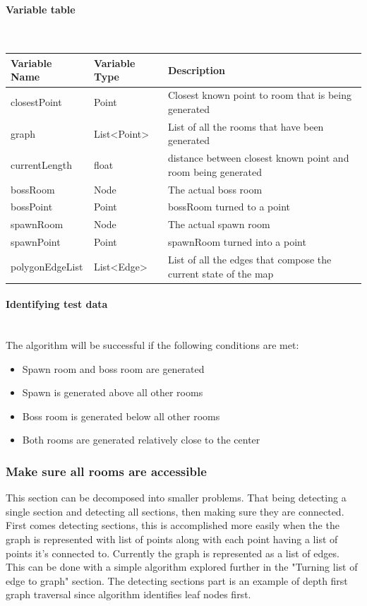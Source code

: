 \documentclass{article}
\newcommand{\myparagraph}[1]{\paragraph{#1}\mbox{}\\} %
\newcommand{\smallBr}{\vspace{1.5mm}}
\begin{document}
\myparagraph{Variable table}
\smallBr
\begin{tabular}{l|l|l}
Variable Name   & Variable Type                      & Description                                                     \\ \hline
closestPoint    & Point                              & Closest known point to room that is being generated             \\
graph           & List\textless{}Point\textgreater{} & List of all the rooms that have been generated                  \\
currentLength   & float                              & distance between closest known point and room being generated   \\
bossRoom        & Node                               & The actual boss room                                            \\
bossPoint       & Point                              & bossRoom turned to a point                                      \\
spawnRoom       & Node                               & The actual spawn room                                           \\
spawnPoint      & Point                              & spawnRoom turned into a point                                   \\
polygonEdgeList & List\textless{}Edge\textgreater{}  & List of all the edges that compose the current state of the map
\end{tabular}

\myparagraph{Identifying test data}
The algorithm will be successful if the following conditions are met:
\begin{itemize}
\item{Spawn room and boss room are generated}
\item{Spawn is generated above all other rooms}
\item{Boss room is generated below all other rooms}
\item{Both rooms are generated relatively close to the center}
\end{itemize}

\subsubsection{Make sure all rooms are accessible}
This section can be decomposed into smaller problems. That being detecting a single section and detecting all sections, then making sure they are connected. First comes detecting sections, this is accomplished more easily when the the graph is represented with list of points along with each point having a list of points it's connected to. Currently the graph is represented as a list of edges. This can be done with a simple algorithm explored further in the "Turning list of edge to graph" section. The detecting sections part is an example of depth first graph traversal since algorithm identifies leaf nodes first.
\end{document}
